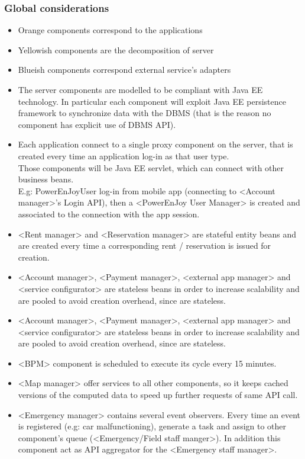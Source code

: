\documentclass[english]{article}
\begin{document}
	\subsubsection*{Global considerations}
	\begin{itemize}
		\item{ Orange components correspond to the applications }
		\item{ Yellowish components are the decomposition of server }
		\item{ Blueish components correspond external service's adapters }
		\item{ The server components are modelled to be compliant with Java EE technology. In particular each component will exploit Java EE persistence framework to synchronize data with the DBMS (that is the reason no component has explicit use of DBMS API).  }
		\item{ Each application connect to a single proxy component on the server, that is created every time an application log-in as that user type.\\ Those components will be Java EE servlet, which can connect with other business beans.\\
		E.g: PowerEnJoyUser log-in from mobile app (connecting to <Account manager>'s Login API), then a <PowerEnJoy User Manager> is created and associated to the connection with the app session.   }
		\item{ <Rent manager> and <Reservation manager> are stateful entity beans and are created every time a corresponding rent / reservation is issued for creation.  }
		\item{ <Account manager>, <Payment manager>, <external app manager> and <service configurator> are stateless beans in order to increase scalability and are pooled to avoid creation overhead, since are stateless. }
		\item{ <Account manager>, <Payment manager>, <external app manager> and <service configurator> are stateless beans in order to increase scalability and are pooled to avoid creation overhead, since are stateless. }
		\item{ <BPM> component is scheduled to execute its cycle every 15 minutes. }
		\item{ <Map manager> offer services to all other components, so it keeps cached versions of the computed data to speed up further requests of same API call. }
		\item{  <Emergency manager> contains several event observers. Every time an event is registered (e.g: car malfunctioning), generate a task and assign to other component's queue (<Emergency/Field staff manger>). In addition this component act as API aggregator for the <Emergency staff manager>. }
	\end{itemize}
\end{document}
